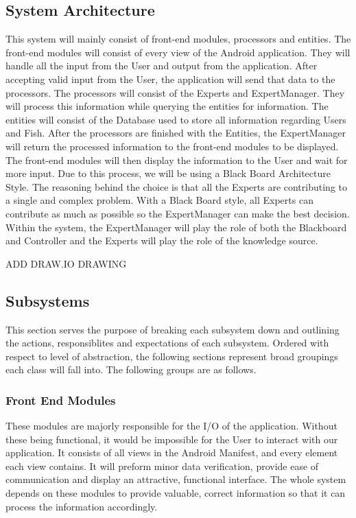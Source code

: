 \documentclass[]{article}
\begin{document}
\subsection{System Architecture}
\label{sub:system_architecture}
This system will mainly consist of front-end modules, processors and entities. 
The front-end modules will consist of every view of the Android application. They will handle all the input from the User and output from the application. After accepting valid input from the User, the application will send that data to the processors. The processors will consist of the Experts and ExpertManager. They will process this information while querying the entities for information. The entities will consist of the Database used to store all information regarding Users and Fish. After the processors are finished with the Entities, the ExpertManager will return the processed information to the front-end modules to be displayed. The front-end modules will then display the information to the User and wait for more input. Due to this process, we will be using a Black Board Architecture Style. The reasoning behind the choice is that all the Experts are contributing to a single and complex problem. With a Black Board style, all Experts can contribute as much as possible so the ExpertManager can make the best decision. Within the system, the ExpertManager will play the role of both the Blackboard and Controller and the Experts will play the role of the knowledge source.

ADD DRAW.IO DRAWING 

\subsection{Subsystems}
\label{sub:subsystems}
This section serves the purpose of breaking each subsystem down and outlining the actions, responsiblites and expectations of each subsystem. Ordered with respect to level of abstraction, the following sections represent broad groupings each class will fall into. The following groups are as follows.
\subsubsection{Front End Modules}
These modules are majorly responsible for the I/O of the application. Without these being functional, it would be impossible for the User to interact with our application. It consists of all views in the Android Manifest, and every element each view contains. It will preform minor data verification, provide ease of communication and display an attractive, functional interface. The whole system depends on these modules to provide valuable, correct information so that it can process the information accordingly. 
\end{document}
